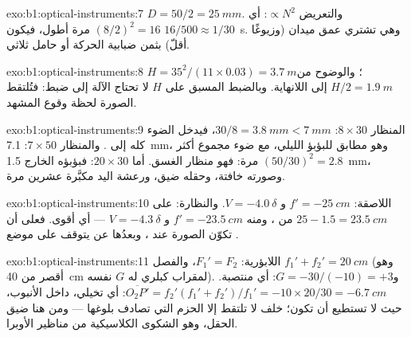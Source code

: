 \begin{solution}{exo:b1:optical-instruments:7}
$D = 50/2 = \qty{25}{mm}$. والتعريض $\propto N^2$: أي $(8/2)^2 = 16$ مرة
أطول، فيكون $16/500 \approx 1/30$~\unit{s}. وهي تشتري عمق ميدان (وزيوغًا
أقلّ) بثمن ضبابية الحركة أو حامل ثلاثي.
\end{solution}

\begin{solution}{exo:b1:optical-instruments:8}
$H = 35^2/(11 \times 0.03) = \qty{3.7}{m}$؛ والوضوح من $H/2 =
\qty{1.9}{m}$ إلى اللانهاية. وبالضبط المسبق على $H$ لا تحتاج الآلة إلى ضبط:
فتُلتقط الصورة لحظة وقوع المشهد.
\end{solution}

\begin{solution}{exo:b1:optical-instruments:9}
المنظار $8\times30$:  $30/8 = \qty{3.8}{mm} < \qty{7}{mm}$، فيدخل الضوء
كله إلى . والمنظار $7\times50$: \qty{7.1}{mm}، وهو مطابق للبؤبؤ الليلي،
مع ضوء مجموع أكثر $(50/30)^2 = 2.8$ مرة: فهو منظار الغسق.
أما $20\times30$: فبؤبؤه الخارج \qty{1.5}{mm}، وصورته خافتة، وحقله ضيق،
ورعشة اليد مكبَّرة عشرين مرة.
\end{solution}

\begin{solution}{exo:b1:optical-instruments:10}
 اللاصقة: $f' = \qty{-25}{cm}$ و $V = \qty{-4.0}{\delta}$. والنظارة:
 على $25 - 1.5 = \qty{23.5}{cm}$ من ، ومنه $f' =
\qty{-23.5}{cm}$ و $V = \qty{-4.3}{\delta}$ --- أي أقوى. فعلى  أن
تكوّن الصورة عند  ، وبعدُها عن 
يتوقف على موضع .
\end{solution}

\begin{solution}{exo:b1:optical-instruments:11}
اللابؤرية: $F_1' = F_2$، والفصل $f_1' + f_2' = \qty{20}{cm}$ (وهو أقصر
من \qty{40}{cm} لمقراب كبلري له $G$ نفسه). و$G = -30/(-10) =
+3$: أي منتصبة.  $\overline{O_2P'} = f_2'(f_1' + f_2')/f_1' =
-10 \times 20/30 = \qty{-6.7}{cm}$: أي تخيلي، داخل الأنبوب، حيث لا تستطيع
 أن تكون؛  خلف  لا تلتقط إلا الحزم التي
تصادف بلوغها --- ومن هنا ضيق الحقل، وهو الشكوى الكلاسيكية من مناظير
الأوبرا.
\end{solution}

